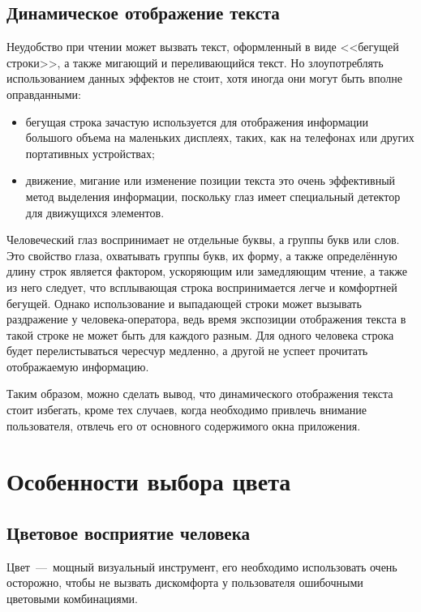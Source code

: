 \documentclass[14pt]{extarticle}
\begin{document}
\subsection{Динамическое отображение текста}

Неудобство при чтении может вызвать текст, оформленный в виде <<бегущей строки>>, а также мигающий и переливающийся текст. Но злоупотреблять использованием данных эффектов не стоит, хотя иногда они могут быть вполне оправданными:

\begin{itemize}
	\item бегущая строка зачастую используется для отображения информации большого объема на маленьких дисплеях, таких, как на телефонах или других портативных устройствах;
	\item движение, мигание или изменение позиции текста это очень эффективный метод выделения информации, поскольку глаз имеет специальный детектор для движущихся элементов.
\end{itemize}

Человеческий глаз воспринимает не отдельные буквы, а группы букв или слов. Это свойство глаза, охватывать группы букв, их форму, а также определённую длину строк является фактором, ускоряющим или замедляющим чтение, а также из него следует, что всплывающая строка воспринимается легче и комфортней бегущей. Однако использование и выпадающей строки может вызывать раздражение у человека-оператора, ведь время экспозиции отображения текста в такой строке не может быть для каждого разным. Для одного человека строка будет перелистываться чересчур медленно, а другой не успеет прочитать отображаемую информацию.

Таким образом, можно сделать вывод, что динамического отображения текста стоит избегать, кроме тех случаев, когда необходимо привлечь внимание пользователя, отвлечь его от основного содержимого окна приложения.

\section{Особенности выбора цвета}

\subsection{Цветовое восприятие человека}

Цвет~---~мощный визуальный инструмент, его необходимо использовать очень осторожно, чтобы не вызвать дискомфорта у пользователя ошибочными цветовыми комбинациями.
\end{document}
